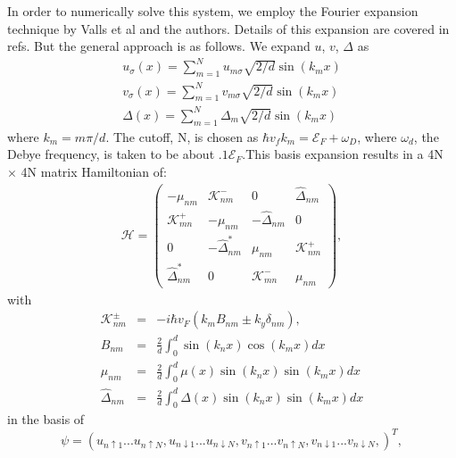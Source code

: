 \documentclass[11pt]{report}
\begin{document}
In order to numerically solve this system, we employ the Fourier expansion technique by Valls et al and the authors. Details of this expansion are covered in refs. But the general approach is as follows.
We expand $u$, $v$, $\Delta$ as 
\begin{eqnarray}
u_{\sigma}(x)=\sum^N_{m=1} u_{m\sigma}\sqrt{2/d} \sin(k_m x)\\
v_{\sigma}(x)=\sum^N_{m=1} v_{m\sigma}\sqrt{2/d} \sin(k_m x)\\
\Delta(x)=\sum^N_{m=1} \Delta_{m}\sqrt{2/d} \sin(k_m x)
\end{eqnarray}
where %
$k_m=m \pi /d$. The cutoff, N, is chosen as $\hbar  v_f k_m=\mathcal{E}_F + \omega_D$, where $\omega_d$, the Debye frequency, is taken to be about $.1 \mathcal{E}_F$.This basis expansion results in a 4N $\times$ 4N matrix Hamiltonian of:
\begin{eqnarray}
&\mathcal{H}=\left(
\begin{array}{cccc}
-\mu_{nm} &  \mathcal{K}^-_{nm} & 0 & \hat{\Delta}_{nm} \\
\mathcal{K}^+_{mn}  & -\mu_{nm}  & -\hat{\Delta}_{nm} & 0 \\
0 & -\hat{\Delta}_{nm}^\ast  & \mu_{nm} &  \mathcal{K}^+_{nm}\\
\hat{\Delta}_{nm}^\ast & 0 &  \mathcal{K}^-_{mn}  & \mu_{nm}
\end{array}\label{fkmodel}
\right),&
\end{eqnarray}
with
\begin{eqnarray}
\mathcal{K}^{\pm}_{nm}&=& -i\hbar  v_F (k_m B_{nm} \pm  k_y \delta_{nm}),\\
B_{nm} &=& \frac{2}{d}\int^d_0  \sin(k_n x) \cos(k_m x) dx\\
\mu_{nm}&=& \frac{2}{d}\int^d_0 \mu(x) \sin(k_n x) \sin(k_m x) dx\\
\hat{\Delta}_{nm}&=&  \frac{2}{d}\int^d_0 \Delta(x) \sin(k_n x) \sin(k_m x) dx
\end{eqnarray}
in the basis of
\begin{equation*}
\psi=  \left ( u_{n\uparrow1}...u_{n\uparrow N}, u_{n\downarrow1}...u_{n\downarrow N}, v_{n\uparrow1}...v_{n\uparrow N}, v_{n\downarrow1}...v_{n\downarrow N}, \right )^T,
\end{equation*} 
\end{document}
